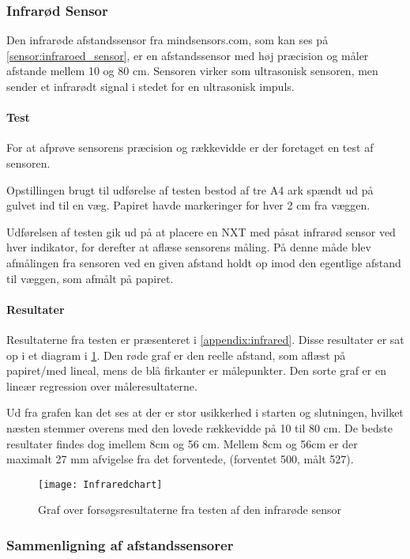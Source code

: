 \subsubsection{Infrarød Sensor}
Den infrarøde afstandssensor fra mindsensors.com, som kan ses på \cref{sensor:infraroed_sensor}, er en afstandssensor med høj præcision og måler afstande mellem 10 og 80 cm.
Sensoren virker som ultrasonisk sensoren, men sender et infrarødt signal i stedet for en ultrasonisk impuls.\cite{infrared}

\paragraph{Test}
For at afprøve sensorens præcision og rækkevidde er der foretaget en test af sensoren.

Opstillingen brugt til udførelse af testen bestod af tre A4 ark spændt ud på gulvet ind til en væg. 
Papiret havde markeringer for hver 2 cm fra væggen.

Udførelsen af testen gik ud på at placere en NXT med påsat infrarød sensor ved hver indikator, for derefter at aflæse sensorens måling.
På denne måde blev afmålingen fra sensoren ved en given afstand holdt op imod den egentlige afstand til væggen, som afmålt på papiret.

\paragraph{Resultater}

Resultaterne fra testen er præsenteret i \cref{appendix:infrared}. 
Disse resultater er sat op i et diagram i \cref{sensor:infrared_chart}.
Den røde graf er den reelle afstand, som aflæst på papiret/med lineal, mens de blå firkanter er målepunkter.
Den sorte graf er en lineær regression over måleresultaterne.

Ud fra grafen kan det ses at der er stor usikkerhed i starten og slutningen, hvilket næsten stemmer overens med den lovede rækkevidde på 10 til 80 cm.
De bedste resultater findes dog imellem 8cm og 56 cm. 
Mellem 8cm og 56cm er der maximalt 27 mm afvigelse fra det forventede, (forventet 500, målt 527).

\begin{figure}[h]
\texttt{[image: Infraredchart]}
\caption{Graf over forsøgsresultaterne fra testen af den infrarøde sensor}
\label{sensor:infrared_chart}
\end{figure}

\subsubsection{Sammenligning af afstandssensorer}

